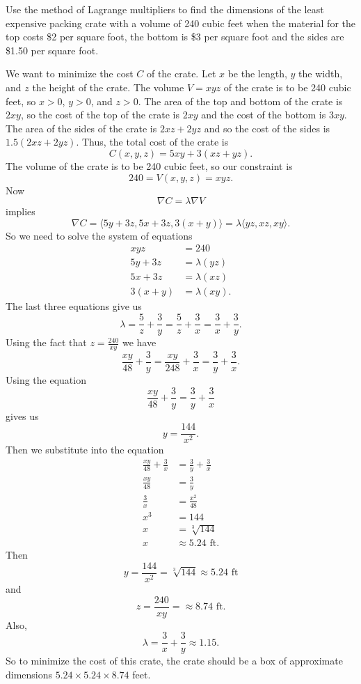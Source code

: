 \begin{activity} \label{A:10.8.2} Use the method of Lagrange
  multipliers to find the dimensions of the least
  expensive packing crate with a volume of 240 cubic feet when the
  material for the top costs \$2 per square foot, the bottom is \$3
  per square foot and the sides are \$1.50 per square foot.  

\end{activity}
\begin{smallhint}

\end{smallhint}
\begin{bighint}

\end{bighint}
\begin{activitySolution}
We want to minimize the cost $C$ of the crate. Let $x$ be the length, $y$ the width, and $z$ the height of the crate. The volume $V = xyz$ of the crate is to be 240 cubic feet, so $x>0$, $y>0$, and $z>0$. The area of the top and bottom of the crate is $2xy$, so the cost of the top of the crate is $2xy$ and the cost of the bottom is $3xy$. The area of the sides of the crate is $2xz + 2yz$ and so the cost of the sides is $1.5(2xz+2yz)$. Thus, the total cost of the crate is
\[C(x,y,z) = 5xy + 3(xz+yz).\]
The volume of the crate is to be 240 cubic feet, so our constraint is
\[240 = V(x,y,z) = xyz.\]
Now
\[\nabla C = \lambda \nabla V\]
implies
\[\nabla C = \langle 5y+3z, 5x+3z, 3(x+y) \rangle = \lambda \langle yz, xz, xy \rangle.\]
So we need to solve the system of equations
\begin{align*}
xyz &= 240 \\
5y+3z &= \lambda(yz) \\
5x+3z &= \lambda(xz) \\
3(x+y) &= \lambda(xy).
\end{align*}
The last three equations give us
\[\lambda = \frac{5}{z} + \frac{3}{y} = \frac{5}{z}+\frac{3}{x} = \frac{3}{x}+\frac{3}{y}.\]
Using the fact that $z = \frac{240}{xy}$ we have
\[\frac{xy}{48}+\frac{3}{y} = \frac{xy}{248}+\frac{3}{x} = \frac{3}{y}+\frac{3}{x}.\]
Using the equation
\[\frac{xy}{48}+\frac{3}{y} =  \frac{3}{y}+\frac{3}{x}\]
gives us
\[y = \frac{144}{x^2}.\]
Then we substitute into the equation
\begin{align*}
\frac{xy}{48}+\frac{3}{x} &= \frac{3}{y}+\frac{3}{x} \\
\frac{xy}{48} &= \frac{3}{y} \\
\frac{3}{x} &= \frac{x^2}{48} \\
x^3 &= 144 \\
x &= \sqrt[3]{144} \\
x &\approx 5.24 \text{ ft}.
\end{align*}
Then
\[y = \frac{144}{x^2} = \sqrt[3]{144} \approx 5.24 \text{ ft}\]
and
\[z = \frac{240}{xy} = \approx 8.74 \text{ ft}.\]
Also,
\[\lambda = \frac{3}{x}+\frac{3}{y} \approx 1.15.\]
So to minimize the cost of this crate, the crate should be a box of approximate dimensions $5.24 \times 5.24 \times 8.74$ feet.

\end{activitySolution}
\aftera

